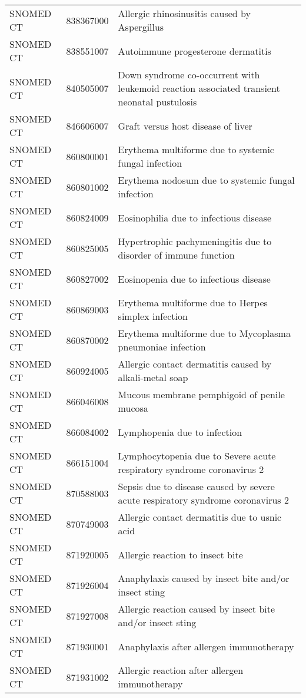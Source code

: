 \begin{longtable}{p{}p{}p{}}
  SNOMED CT & 838367000 & Allergic rhinosinusitis caused by Aspergillus \\ 
  SNOMED CT & 838551007 & Autoimmune progesterone dermatitis \\ 
  SNOMED CT & 840505007 & Down syndrome co-occurrent with leukemoid reaction associated transient neonatal pustulosis \\ 
  SNOMED CT & 846606007 & Graft versus host disease of liver \\ 
  SNOMED CT & 860800001 & Erythema multiforme due to systemic fungal infection \\ 
  SNOMED CT & 860801002 & Erythema nodosum due to systemic fungal infection \\ 
  SNOMED CT & 860824009 & Eosinophilia due to infectious disease \\ 
  SNOMED CT & 860825005 & Hypertrophic pachymeningitis due to disorder of immune function \\ 
  SNOMED CT & 860827002 & Eosinopenia due to infectious disease \\ 
  SNOMED CT & 860869003 & Erythema multiforme due to Herpes simplex infection \\ 
  SNOMED CT & 860870002 & Erythema multiforme due to Mycoplasma pneumoniae infection \\ 
  SNOMED CT & 860924005 & Allergic contact dermatitis caused by alkali-metal soap \\ 
  SNOMED CT & 866046008 & Mucous membrane pemphigoid of penile mucosa \\ 
  SNOMED CT & 866084002 & Lymphopenia due to infection \\ 
  SNOMED CT & 866151004 & Lymphocytopenia due to Severe acute respiratory syndrome coronavirus 2 \\ 
  SNOMED CT & 870588003 & Sepsis due to disease caused by severe acute respiratory syndrome coronavirus 2 \\ 
  SNOMED CT & 870749003 & Allergic contact dermatitis due to usnic acid \\ 
  SNOMED CT & 871920005 & Allergic reaction to insect bite \\ 
  SNOMED CT & 871926004 & Anaphylaxis caused by insect bite and/or insect sting \\ 
  SNOMED CT & 871927008 & Allergic reaction caused by insect bite and/or insect sting \\ 
  SNOMED CT & 871930001 & Anaphylaxis after allergen immunotherapy \\ 
  SNOMED CT & 871931002 & Allergic reaction after allergen immunotherapy \\ 

\end{longtable}
